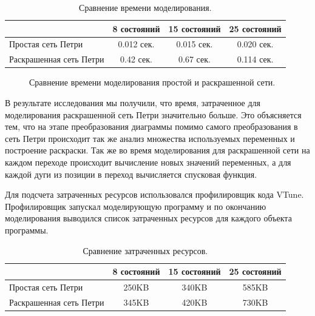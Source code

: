 \begin{table}
	\caption{Сравнение времени моделирования.}
	\begin{tabular}{|l|c|c|c|}
	\hline
	& 8 состояний & 15 состояний & 25 состояний \\
	\hline
	Простая сеть Петри & 0.012 сек. & 0.015 сек. &  0.020 сек. \\
	\hline
	Раскрашенная сеть Петри & 0.42 сек. & 0.67 сек. &  0.114 сек. \\
	\hline
	\end{tabular}
	\label{tab:table1}
\end{table}

\begin{figure}
	\centering
	\caption{Сравнение времени моделирования простой и раскрашенной сети.}
	\label{fig:fig30}
\end{figure}

В результате исследования мы получили, что время, затраченное для моделирования раскрашенной сеть Петри значительно больше. Это объясняется тем, что на этапе преобразования диаграммы помимо самого преобразования в сеть Петри происходит так же анализ множества используемых переменных и построение раскраски. Так же во время моделирования для раскрашенной сети на каждом переходе происходит вычисление новых значений переменных, а для каждой дуги из позиции в переход вычисляется спусковая функция.

Для подсчета затраченных ресурсов использовался профилировщик кода VTune. Профилировщик запускал моделирующую программу и по окончанию моделирования выводился список затраченных ресурсов для каждого объекта программы.

\begin{table}
	\caption{Сравнение затраченных ресурсов.}
	\begin{tabular}{|l|c|c|c|}
	\hline
	& 8 состояний & 15 состояний & 25 состояний \\
	\hline
	Простая сеть Петри & 250KB & 340KB & 585KB \\
	\hline
	Раскрашенная сеть Петри & 345KB & 420KB & 730KB \\
	\hline
	\end{tabular}
	\label{tab:table2}
\end{table}

